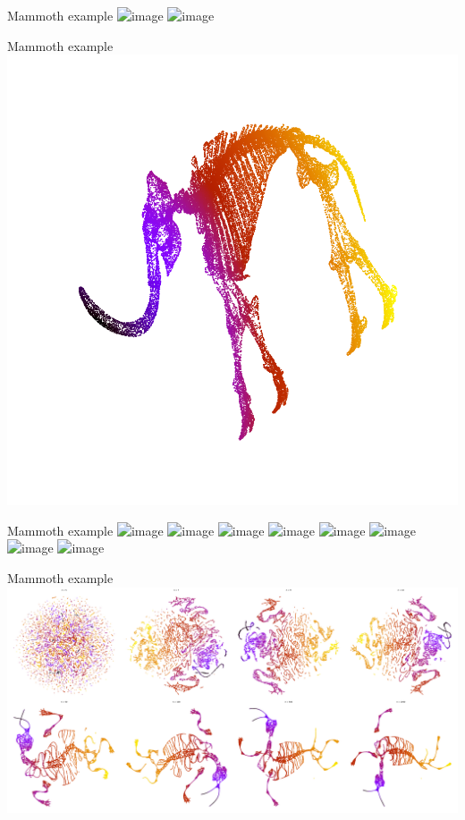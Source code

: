 \documentclass{irdbeamer}
\begin{document}
\begin{frame}{Mammoth example}
    \centering
    \vspace{-.5cm}
    \includegraphics<1>[width=.6\textwidth]{./figs/mammoth/3d_single.png}%
    \includegraphics<2>[width=.6\textwidth]{./figs/mammoth/3d_color.png}%
\end{frame}

\begin{frame}{Mammoth example}
    \centering
    \vspace{-.5cm}
    \includegraphics[width=.6\textwidth]{./figs/mammoth/pca.png}
\end{frame}

\begin{frame}{Mammoth example}
    \centering
    \vspace{-.5cm}
    \includegraphics<1>[width=.6\textwidth]{./figs/mammoth/n5.png}%
    \includegraphics<2>[width=.6\textwidth]{./figs/mammoth/n7.png}%
    \includegraphics<3>[width=.6\textwidth]{./figs/mammoth/n9.png}%
    \includegraphics<4>[width=.6\textwidth]{./figs/mammoth/n10.png}%
    \includegraphics<5>[width=.6\textwidth]{./figs/mammoth/n50.png}%
    \includegraphics<6>[width=.6\textwidth]{./figs/mammoth/n100.png}%
    \includegraphics<7>[width=.6\textwidth]{./figs/mammoth/n500.png}%
    \includegraphics<8>[width=.6\textwidth]{./figs/mammoth/n1000.png}%
\end{frame}

\begin{frame}{Mammoth example}
    \centering
    \includegraphics[width=.8\textwidth]{./figs/mammoth/combined_scatter_plots.png}
\end{frame}
\end{document}

